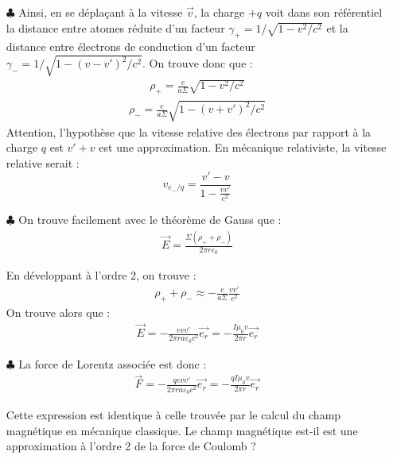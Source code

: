 \documentclass{report}
\begin{document}
	\begin{itemize}
	
		\item[$\clubsuit$] Ainsi, en se déplaçant à la vitesse $\vec{v}$, la charge $+q$ voit dans son référentiel la distance entre atomes réduite d'un facteur $\gamma_{+}=1/\sqrt{1-v^{2}/c^{2}}$ et la distance entre électrons de conduction d'un facteur $\gamma_{-}=1/\sqrt{1-(v-v')^{2}/c^{2}}$. 
		On trouve donc que :
		\begin{align*}
			\rho_+=\frac{e}{a\Sigma}\sqrt{1-v^{2}/c^{2}}
		\end{align*}
		\begin{align*}
			\rho_-=\frac{e}{a\Sigma}\sqrt{1-(v+v')^{2}/c^{2}}
		\end{align*}		
		Attention, l'hypothèse que la vitesse relative des électrons par rapport à la charge $q$ est $v'+v$ est une approximation. En mécanique relativiste, la vitesse relative serait :
		\begin{equation}
			v_{e_-/q}=\frac{v'-v}{1-\frac{vv'}{c^2}}
		\end{equation}
		
	\item[$\clubsuit$] On trouve facilement avec le théorème de Gauss que :
	\begin{align*}
		\vec{E}=\frac{\Sigma(\rho_++\rho_-)}{2\pi r\varepsilon_0}
	\end{align*}
	
	 En développant à l'ordre 2, on trouve :
	\begin{align*}
		\rho_++\rho_-\approx -\frac{e}{a\Sigma}\frac{vv'}{c^2}
	\end{align*}
	On trouve alors que :
	\begin{align*}
		\vec{E}=-\frac{e vv'}{2\pi r a\varepsilon_0 c^2}\vec{e_r}=-\frac{I\mu_0 v}{2\pi r}\vec{e_r}
	\end{align*}
	
	\item[$\clubsuit$]
	La force de Lorentz associée est donc :
	\begin{align*}
		\vec{F}=-\frac{qe vv'}{2\pi r a\varepsilon_0 c^2}\vec{e_r}=-\frac{qI\mu_0 v}{2\pi r}\vec{e_r}
	\end{align*}
	
	Cette expression est identique à celle trouvée par le calcul du champ magnétique en mécanique classique. Le champ magnétique est-il est une approximation à l'ordre 2 de la force de Coulomb ? 
	\end{itemize}
\end{document}
